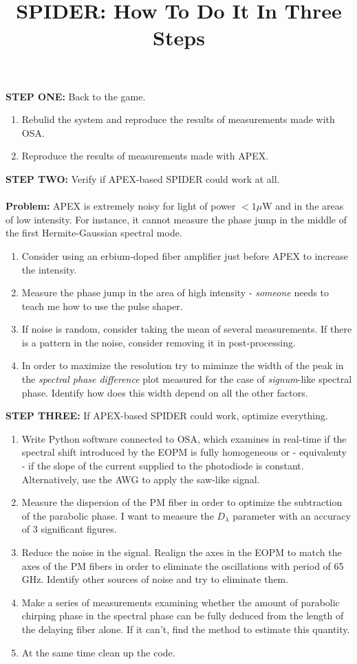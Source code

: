 \documentclass{article}
\begin{document}
\title{SPIDER: How To Do It In Three Steps}
\maketitle
\thispagestyle{empty}
\noindent
\textbf{STEP ONE:} Back to the game.
\begin{enumerate}
	\item Rebulid the system and reproduce the results of measurements made with OSA.
	\item Reproduce the results of measurements made with APEX.
\end{enumerate}
\textbf{STEP TWO:} Verify if APEX-based SPIDER could work at all.\\ \\
\textbf{Problem:} APEX is extremely noisy for light of power $<1\mu$W and in the areas of low intensity. For instance, it cannot measure the phase jump in the middle of the first Hermite-Gaussian spectral mode.
\begin{enumerate}
	\item Consider using an erbium-doped fiber amplifier just before APEX to increase the intensity.
	\item Measure the phase jump in the area of high intensity - \emph{someone} needs to teach me how to use the pulse shaper.
	\item If noise is random, consider taking the mean of several measurements. If there is a pattern in the noise, consider removing it in post-processing.
	\item In order to maximize the resolution try to miminze the width of the peak in the \emph{spectral phase difference} plot measured for the case of \emph{signum}-like spectral phase. Identify how does this width depend on all the other factors.
\end{enumerate}
\textbf{STEP THREE:} If APEX-based SPIDER could work, optimize everything.
\begin{enumerate}
	\item Write Python software connected to OSA, which examines in real-time if the spectral shift introduced by the EOPM is fully homogeneous or - equivalenty - if the slope of the current supplied to the photodiode is constant. Alternatively, use the AWG to apply the saw-like signal.
	\item Measure the dispersion of the PM fiber in order to optimize the subtraction of the parabolic phase. I want to measure the $D_\lambda$ parameter with an accuracy of 3 significant figures.
	\item Reduce the noise in the signal. Realign the axes in the EOPM to match the axes of the PM fibers in order to eliminate the oscillations with period of 65 GHz. Identify other sources of noise and try to eliminate them.
	\item Make a series of measurements examining whether the amount of parabolic chirping phase in the spectral phase can be fully deduced from the length of the delaying fiber alone. If it can't, find the method to estimate this quantity.
	\item At the same time clean up the code.
\end{enumerate}
\end{document}
